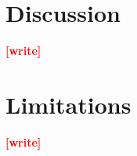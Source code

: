 \documentclass[11pt,a4paper]{article}
\newcommand{\pending}[1]{\textcolor{red}{\textbf{[#1]}}}   %
\begin{document}

\section{Discussion}\label{sec:discussion}
\pending{write}

\section{Limitations}\label{sec:limitations}
\pending{write}
\end{document}
